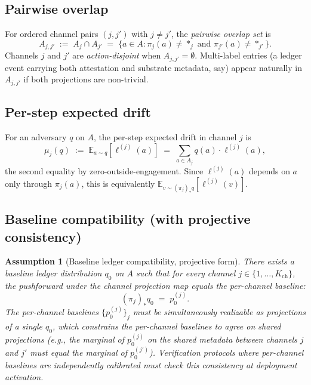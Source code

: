 \documentclass{article}
\newtheorem{assumption}{Assumption}
\newcommand{\Kch}{K_{\mathrm{ch}}}
\begin{document}
\subsection{Pairwise overlap}

For ordered channel pairs $(j, j')$ with $j \neq j'$, the
\emph{pairwise overlap set} is
\begin{equation}
  A_{j, j'} \;:=\; A_j \cap A_{j'}
  \;=\; \{a \in A : \pi_j(a) \neq *_j \text{ and } \pi_{j'}(a)
  \neq *_{j'}\}.
\end{equation}
Channels $j$ and $j'$ are \emph{action-disjoint} when $A_{j, j'} =
\emptyset$.  Multi-label entries (a ledger event carrying both
attestation and substrate metadata, say) appear naturally in
$A_{j, j'}$ if both projections are non-trivial.

\subsection{Per-step expected drift}

For an adversary $q$ on $A$, the per-step expected drift in channel
$j$ is
\begin{equation}
\label{eq:drift-def-v3}
  \mu_j(q) \;:=\; \mathbb{E}_{a \sim q}[\ell^{(j)}(a)]
  \;=\; \sum_{a \in A_j} q(a) \cdot \ell^{(j)}(a),
\end{equation}
the second equality by zero-outside-engagement.  Since
$\ell^{(j)}(a)$ depends on $a$ only through $\pi_j(a)$, this is
equivalently $\mathbb{E}_{v \sim (\pi_j)_* q}[\ell^{(j)}(v)]$.

\subsection{Baseline compatibility (with projective consistency)}

\begin{assumption}[Baseline ledger compatibility, projective form]
\label{ass:baseline-compat-v3}
There exists a baseline ledger distribution $q_0$ on $A$ such that
for every channel $j \in \{1, \ldots, \Kch\}$, the pushforward
under the channel projection map equals the per-channel baseline:
\begin{equation}
\label{eq:projective-baseline}
  (\pi_j)_* q_0 \;=\; p_0^{(j)}.
\end{equation}
The per-channel baselines $\{p_0^{(j)}\}_j$ must be
\emph{simultaneously realizable} as projections of a single $q_0$,
which constrains the per-channel baselines to agree on shared
projections (e.g., the marginal of $p_0^{(j)}$ on the shared
metadata between channels $j$ and $j'$ must equal the marginal
of $p_0^{(j')}$).  Verification protocols where per-channel
baselines are independently calibrated must check this consistency
at deployment activation.
\end{assumption}
\end{document}
